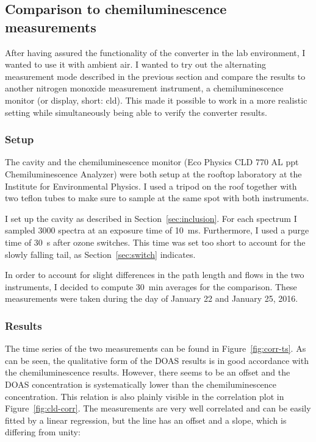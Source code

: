 \subsection{Comparison to chemiluminescence measurements}
\label{sec:cld}

After having assured the functionality of the converter in the lab
environment, I wanted to use it with ambient air. I wanted to try out
the alternating measurement mode described in the previous section and
compare the results to another nitrogen monoxide measurement
instrument, a chemiluminescence monitor (or display, short: cld). This
made it possible to work in a more realistic setting while
simultaneously being able to verify the converter results.

\subsubsection{Setup}
\label{sec:cld-setup}

The cavity and the chemiluminescence monitor (Eco Physics CLD 770 AL
ppt Chemiluminescence  Analyzer) were both setup at the rooftop
laboratory at the Institute for Environmental Physics. I used a
tripod on the roof together with two teflon tubes to make sure to
sample at the same spot with both instruments.

I set up the cavity as described in Section~\ref{sec:inclusion}. For
each spectrum I sampled 3000 spectra at an exposure time of
\SI{10}{\milli\second}. Furthermore, I used a purge time of
\SI{30}{\second} after ozone switches. This time was set too short to
account for the slowly falling tail, as Section~\ref{sec:switch}
indicates.

In order to account for slight differences in the path length and
flows in the two instruments, I decided to compute \SI{30}{\minute}
averages for the comparison. These measurements were taken during the
day of January 22 and January 25, 2016.

\subsubsection{Results}
\label{sec:cld-results}

The time series of the two measurements can be found in
Figure~\ref{fig:corr-ts}. As can be seen, the qualitative form of the
DOAS results is in good accordance with the chemiluminescence results.
However, there seems to be an offset and the DOAS concentration is
systematically lower than the chemiluminescence concentration. This
relation is also plainly visible in the correlation plot in
Figure~\ref{fig:cld-corr}. The measurements are very well correlated
and can be easily fitted by a linear regression, but the line has an
offset and a slope, which is differing from unity:

